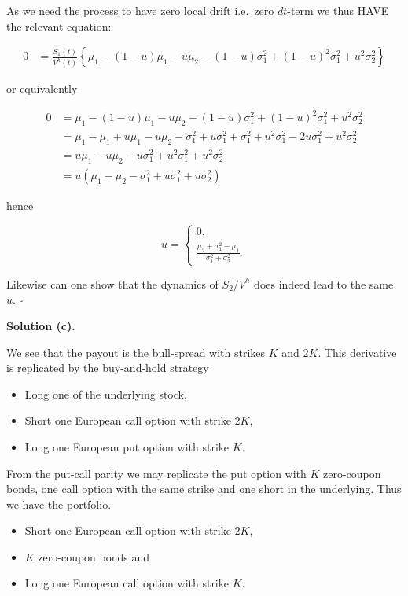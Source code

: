 \documentclass[
]{book}
\providecommand{\tightlist}{%
  \setlength{\itemsep}{0pt}\setlength{\parskip}{0pt}}
\begin{document}
As we need the process to have zero local drift i.e.~zero \(dt\)-term we thus HAVE the relevant equation:

\begin{align*}
0&=\frac{S_1(t)}{V^h(t)}\left\{\mu_1-(1-u)\mu_1-u\mu_2-(1-u)\sigma_1^2+(1-u)^2\sigma_1^2+u^2\sigma_2^2\right\}
\end{align*}

or equivalently

\begin{align*}
0&=\mu_1-(1-u)\mu_1-u\mu_2-(1-u)\sigma_1^2+(1-u)^2\sigma_1^2+u^2\sigma_2^2\\
&=\mu_1-\mu_1+u\mu_1-u\mu_2-\sigma_1^2+u\sigma_1^2+\sigma_1^2+u^2\sigma_1^2-2u\sigma_1^2+u^2\sigma_2^2\\
&=u\mu_1-u\mu_2-u\sigma_1^2+u^2\sigma_1^2+u^2\sigma_2^2\\
&=u(\mu_1-\mu_2-\sigma_1^2+u\sigma_1^2+u\sigma_2^2)
\end{align*}

hence

\[
u=\begin{cases}
0,\\
\frac{\mu_2+\sigma_1^2-\mu_1}{\sigma_1^2+\sigma_2^2}.
\end{cases}
\]

Likewise can one show that the dynamics of \(S_2/V^h\) does indeed lead to the same \(u\). \(\square\)

\noindent\makebox[\linewidth]{\rule{\textwidth}{0.4pt}}

\textbf{Solution (c).}

We see that the payout is the bull-spread with strikes \(K\) and \(2K\). This derivative is replicated by the buy-and-hold strategy

\begin{itemize}
\tightlist
\item
  Long one of the underlying stock,
\item
  Short one European call option with strike \(2K\),
\item
  Long one European put option with strike \(K\).
\end{itemize}

From the put-call parity we may replicate the put option with \(K\) zero-coupon bonds, one call option with the same strike and one short in the underlying. Thus we have the portfolio.

\begin{itemize}
\tightlist
\item
  Short one European call option with strike \(2K\),
\item
  \(K\) zero-coupon bonds and
\item
  Long one European call option with strike \(K\).
\end{itemize}
\end{document}
